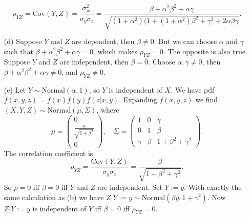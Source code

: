 \begin{itemize}
        \begin{equation*}
            \rho_{YZ} = \mathrm{Cov}(Y, Z)
                = \frac{\sigma_{yz}^2}{\sigma_y \sigma_z}
                = \frac{\beta + \alpha^2 \beta^2 + \alpha \gamma}{\sqrt{(1 + \alpha^2)(1 + (1 + \alpha^2) \beta^2 + \gamma^2 + 2 \alpha \beta \gamma}}.
        \end{equation*}
    \item[(d)] Suppose $Y$ and $Z$ are dependent, then $\beta \neq 0$.
        But we can choose $\alpha$ and $\gamma$ such that $\beta + \alpha^2\beta^2 + \alpha\gamma = 0$, which makes $\rho_{YZ} = 0$.
        The opposite is also true.
        Suppose $Y$ and $Z$ are independent, then $\beta = 0$.
        Choose $\alpha, \gamma \neq 0$, then $\beta + \alpha^2 \beta^2 + \alpha \gamma \neq 0$, and $\rho_{YZ} \neq 0$.
    \item[(e)] Let $Y \sim \mathrm{Normal}(\alpha, 1)$, so $Y$ is independent of $X$.
        We have pdf $f(x, y, z) = f(x)f(y)f(z|x,y)$.
        Expanding $f(x,y,z)$ we find $(X, Y, Z) \sim \mathrm{Normal}(\mu, \Sigma)$, where
        \begin{equation*}
            \mu = \begin{pmatrix}
                0 \\
                \frac{\alpha}{\sqrt{1 + \beta^2}} \\
                0
            \end{pmatrix}, \quad
            \Sigma = \begin{pmatrix}
                1 & 0 & \gamma \\
                0 & 1 & \beta \\
                \gamma & \beta & 1 + \beta^2 + \gamma^2
            \end{pmatrix}.
        \end{equation*}
        The correlation coefficient is
        \begin{equation*}
            \rho_{YZ} = \frac{\mathrm{Cov}(Y,Z)}{\sigma_y \sigma_z} = \frac{\beta}{\sqrt{1 + \beta^2 + \gamma^2}}.
        \end{equation*}
        So $\rho = 0$ iff $\beta = 0$ iff $Y$ and $Z$ are independent.
        Set $Y := y$.
        With exactly the same calculation as (b) we have $Z|Y:=y \sim \mathrm{Normal}(\beta y, 1 + \gamma^2)$.
        Now $Z|Y:=y$ is independent of $Y$ iff $\beta = 0$ iff $\rho_{YZ} = 0$.
\end{itemize}
